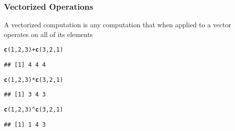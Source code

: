\documentclass[12pt]{beamer}\usepackage[]{graphicx}\usepackage[]{color}
\makeatletter
\newcommand{\hlnum}[1]{\textcolor[rgb]{0.686,0.059,0.569}{#1}}%
\newcommand{\hlopt}[1]{\textcolor[rgb]{0,0,0}{#1}}%
\newcommand{\hlstd}[1]{\textcolor[rgb]{0.345,0.345,0.345}{#1}}%
\newcommand{\hlkwd}[1]{\textcolor[rgb]{0.737,0.353,0.396}{\textbf{#1}}}%
\newenvironment{kframe}{%
 \def\at@end@of@kframe{}%
 \ifinner\ifhmode%
  \def\at@end@of@kframe{\end{minipage}}%
  \begin{minipage}{\columnwidth}%
 \fi\fi%
 \def\FrameCommand##1{\hskip\@totalleftmargin \hskip-\fboxsep
 \colorbox{shadecolor}{##1}\hskip-\fboxsep
     \hskip-\linewidth \hskip-\@totalleftmargin \hskip\columnwidth}%
 \MakeFramed {\advance\hsize-\width
   \@totalleftmargin\z@ \linewidth\hsize
   \@setminipage}}%
 {\par\unskip\endMakeFramed%
 \at@end@of@kframe}
\newenvironment{knitrout}{}{} %
\makeatother
\begin{document}
\begin{frame}[fragile]
\frametitle{Vectorized Operations}

A vectorized computation is any computation that when applied to a vector operates on all of its elements
\begin{knitrout}\footnotesize
{}\color{fgcolor}\begin{kframe}
\begin{alltt}
\hlkwd{c}\hlstd{(}\hlnum{1}\hlstd{,} \hlnum{2}\hlstd{,} \hlnum{3}\hlstd{)} \hlopt{+} \hlkwd{c}\hlstd{(}\hlnum{3}\hlstd{,} \hlnum{2}\hlstd{,} \hlnum{1}\hlstd{)}
\end{alltt}
\begin{verbatim}
## [1] 4 4 4
\end{verbatim}
\begin{alltt}
\hlkwd{c}\hlstd{(}\hlnum{1}\hlstd{,} \hlnum{2}\hlstd{,} \hlnum{3}\hlstd{)} \hlopt{*} \hlkwd{c}\hlstd{(}\hlnum{3}\hlstd{,} \hlnum{2}\hlstd{,} \hlnum{1}\hlstd{)}
\end{alltt}
\begin{verbatim}
## [1] 3 4 3
\end{verbatim}
\begin{alltt}
\hlkwd{c}\hlstd{(}\hlnum{1}\hlstd{,} \hlnum{2}\hlstd{,} \hlnum{3}\hlstd{)} \hlopt{^} \hlkwd{c}\hlstd{(}\hlnum{3}\hlstd{,} \hlnum{2}\hlstd{,} \hlnum{1}\hlstd{)}
\end{alltt}
\begin{verbatim}
## [1] 1 4 3
\end{verbatim}
\end{kframe}
\end{knitrout}

\end{frame}

\end{document}
